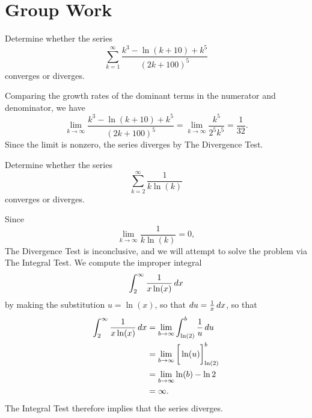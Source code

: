 \documentclass[]{ximera}
\begin{document}
\section{Group Work}

\begin{problem}
Determine whether the series
$$
\sum_{k=1}^\infty \frac{k^3 - \ln(k+10) + k^5}{(2k+100)^5}
$$
converges or diverges.

\begin{solution}
Comparing the growth rates of the dominant terms in the numerator and denominator, we have 
$$
\lim_{k \rightarrow \infty} \frac{k^3 - \ln(k+10) + k^5}{(2k+100)^5} = \lim_{k\rightarrow \infty} \frac{k^5}{2^5 k^5} = \frac{1}{32} .
$$
Since the limit is nonzero, the series diverges by The Divergence Test.
\end{solution}
\end{problem}


\begin{problem}
Determine whether the series
$$
\sum_{k=2}^\infty \frac{1}{k \ln (k)}
$$
converges or diverges.

\begin{solution}
Since 
$$
\lim_{k \rightarrow \infty} \frac{1}{k \ln (k)} = 0,
$$
The Divergence Test is inconclusive, and we will attempt to solve the problem via The Integral Test. We compute the improper integral
\begin{align*}
\int_2^\infty \frac{1}{x \ln (x)} \mathop{}\!d x
\end{align*}
by making the substitution $u = \ln (x)$, so that $\mathop{}\!d u = \frac{1}{x} \mathop{}\!d x$, so that 
\begin{align*}
\int_2^\infty \frac{1}{x \ln (x)} \mathop{}\!d x &= \lim_{b \rightarrow \infty} \int_{\ln (2)}^b \frac{1}{u} \mathop{}\!d u \\
&= \lim_{b \rightarrow \infty} \bigg[ \ln(u) \bigg]_{\ln(2)}^b \\
&= \lim_{b \rightarrow \infty} \ln(b) - \ln 2 \\
&= \infty.
\end{align*}
The Integral Test therefore implies that the series diverges.
\end{solution}
\end{problem}
\end{document}
